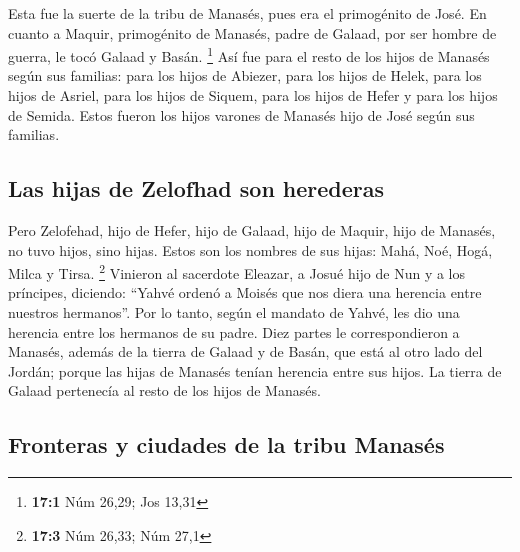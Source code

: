 \begin{paracol}{2}
 Esta fue la suerte de la tribu de Manasés, pues era el
primogénito de José. En cuanto a Maquir, primogénito de Manasés, padre
de Galaad, por ser hombre de guerra, le tocó Galaad y Basán. \footnote{\textbf{17:1}
  Núm 26,29; Jos 13,31}  Así fue para el resto de los
hijos de Manasés según sus familias: para los hijos de Abiezer, para los
hijos de Helek, para los hijos de Asriel, para los hijos de Siquem, para
los hijos de Hefer y para los hijos de Semida. Estos fueron los hijos
varones de Manasés hijo de José según sus familias.

\hypertarget{las-hijas-de-zelofhad-son-herederas}{%
\subsection{Las hijas de Zelofhad son
herederas}\label{las-hijas-de-zelofhad-son-herederas}}

 Pero Zelofehad, hijo de Hefer, hijo de Galaad, hijo de
Maquir, hijo de Manasés, no tuvo hijos, sino hijas. Estos son los
nombres de sus hijas: Mahá, Noé, Hogá, Milca y Tirsa. \footnote{\textbf{17:3}
  Núm 26,33; Núm 27,1}  Vinieron al sacerdote Eleazar, a
Josué hijo de Nun y a los príncipes, diciendo: ``Yahvé ordenó a Moisés
que nos diera una herencia entre nuestros hermanos''. Por lo tanto,
según el mandato de Yahvé, les dio una herencia entre los hermanos de su
padre.  Diez partes le correspondieron a Manasés, además
de la tierra de Galaad y de Basán, que está al otro lado del Jordán;
 porque las hijas de Manasés tenían herencia entre sus
hijos. La tierra de Galaad pertenecía al resto de los hijos de Manasés.

\hypertarget{fronteras-y-ciudades-de-la-tribu-manasuxe9s}{%
\subsection{Fronteras y ciudades de la tribu
Manasés}\label{fronteras-y-ciudades-de-la-tribu-manasuxe9s}}


\end{paracol}
